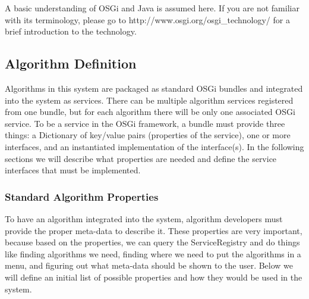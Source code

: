 \documentclass[a4]{article}
\begin{document}
A basic understanding of OSGi and Java is assumed here. If you are not familiar 
with its terminology, please go to http://www.osgi.org/osgi\_technology/ for a 
brief introduction to the technology.

\subsection{Algorithm Definition}

Algorithms in this system are packaged as standard OSGi bundles and integrated 
into the system as services. There can be multiple algorithm services 
registered from one bundle, but for each algorithm there will be only one 
associated OSGi service. To be a service in the OSGi framework, a bundle must 
provide three things: a Dictionary of key/value pairs (properties of the 
service), one or more interfaces, and an instantiated implementation of the 
interface(s). In the following sections we will describe what properties are
needed and define the service interfaces that must be implemented.

\subsubsection{Standard Algorithm Properties}

To have an algorithm integrated into the system, algorithm developers must 
provide the proper meta-data to describe it. These properties are very 
important, because based on the properties, we can query the ServiceRegistry 
and do things like finding algorithms we need, finding where we need to put the 
algorithms in a menu, and figuring out what meta-data should be shown to the 
user. Below we will define an initial list of possible properties and how they 
would be used in the system.
\end{document}
